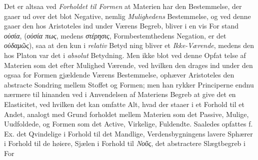 \documentclass[12pt,a4paper]{book}
\newcommand{\gk}[1]{\textit{#1}}
\begin{document}
Det er altsaa ved \emph{Forholdet til Formen} at Materien
har den Bestemmelse, der gaaer ud over det blot Negative,
nemlig \emph{Mulighedens} Bestemmelse, og ved denne gaaer den
hos Aristoteles ind under Værens Begreb, bliver i en vis For\-%
stand \gk{οὐσία}, (\gk{οὐσία πως}, medens \gk{στέρησις}, Formbestemthedens
Negation, er det \gk{οὐδαμῶς}), saa at den kun i \emph{relativ} Betyd\-%
ning bliver et \emph{Ikke-Værende}, medens den hos Platon var
det i \emph{absolut} Betydning. Men ikke blot ved denne Opfat\-%
telse af Materien som det efter Mulighed Værende, ved hvilken
den drages ind under den ogsaa for Formen gjældende Værens
Bestemmelse, ophæver Aristoteles den abstracte Sondring
mellem Stoffet og Formen; men han rykker Principerne endnu
nærmere til hinanden ved i Anvendelsen af Materiens Begreb
at give det en Elasticitet, ved hvilken det kan omfatte Alt,
hvad der staaer i et Forhold til et Andet, analogt med Grund\-%
forholdet mellem Materien som det Passive, Mulige, Uudfoldede,
og Formen som det Active, Virkelige, Fuldendte. Saaledes
opfattes f. Ex. det Qvindelige i Forhold til det Mandlige,
Verdensbygningens lavere Sphærer i Forhold til de høiere,
Sjælen i Forhold til \gk{Νοῦς}, det abstractere Slægtbegreb i For\-%
\end{document}
